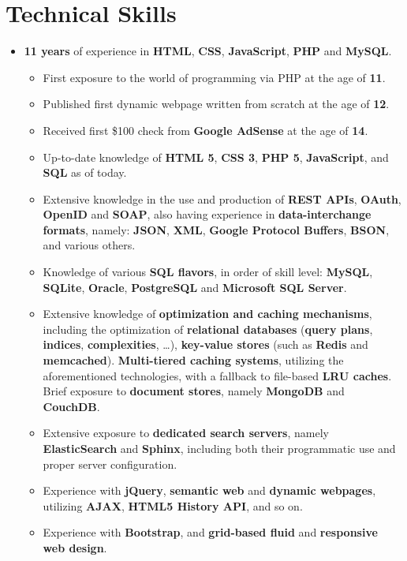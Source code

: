 \documentclass[12pt,a4paper]{article}
\begin{document}
\section*{Technical Skills}
	\begin{itemize}
	\item	\textbf{11 years} of experience in \textbf{HTML}, \textbf{CSS}, \textbf{JavaScript}, \textbf{PHP} and \textbf{MySQL}.
		\begin{itemize}
		\item	First exposure to the world of programming via PHP at the age of \textbf{11}.
		\item	Published first dynamic webpage written from scratch at the age of \textbf{12}.
		\item	Received first \$100 check from \textbf{Google AdSense} at the age of \textbf{14}.
		\item	Up-to-date knowledge of \textbf{HTML 5}, \textbf{CSS 3}, \textbf{PHP 5}, \textbf{JavaScript}, and \textbf{SQL} as of today.
		\item	Extensive knowledge in the use and production of \textbf{REST APIs}, \textbf{OAuth}, \textbf{OpenID} and \textbf{SOAP}, also having experience in \textbf{data-interchange formats}, namely: \textbf{JSON}, \textbf{XML}, \textbf{Google Protocol Buffers}, \textbf{BSON}, and various others.
		\item	Knowledge of various \textbf{SQL flavors}, in order of skill level: \textbf{MySQL}, \textbf{SQLite}, \textbf{Oracle}, \textbf{PostgreSQL} and \textbf{Microsoft SQL Server}.
		\item	Extensive knowledge of \textbf{optimization and caching mechanisms}, including the optimization of \textbf{relational databases} (\textbf{query plans}, \textbf{indices}, \textbf{complexities}, \ldots), \textbf{key-value stores} (such as \textbf{Redis} and \textbf{memcached}). \textbf{Multi-tiered caching systems}, utilizing the aforementioned technologies, with a fallback to file-based \textbf{LRU caches}. Brief exposure to \textbf{document stores}, namely \textbf{MongoDB} and \textbf{CouchDB}.
		\item	Extensive exposure to \textbf{dedicated search servers}, namely \textbf{ElasticSearch} and \textbf{Sphinx}, including both their programmatic use and proper server configuration. 
		\item	Experience with \textbf{jQuery}, \textbf{semantic web} and \textbf{dynamic webpages}, utilizing \textbf{AJAX}, \textbf{HTML5 History API}, and so on.
		\item	Experience with \textbf{Bootstrap}, and \textbf{grid-based fluid} and \textbf{responsive web design}.

\end{itemize}
\end{itemize}
\end{document}
